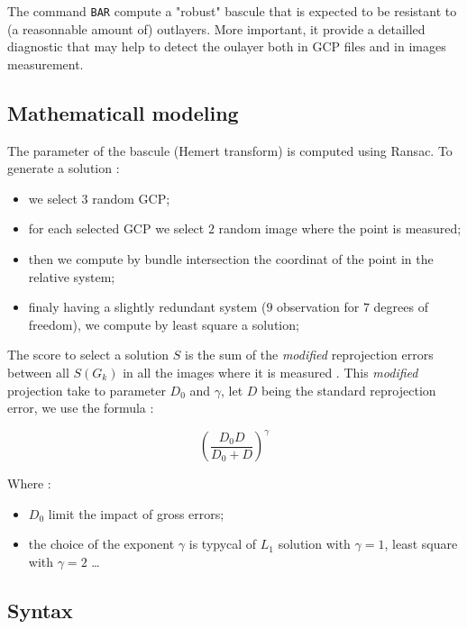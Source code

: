 The command {\tt BAR} compute a "robust" bascule  that is expected to be resistant
to (a reasonnable amount of) outlayers. More important, it provide a detailled
diagnostic that may help to detect the oulayer both in GCP files and in images
measurement.


\subsection{Mathematicall modeling}

The  parameter of the bascule (Hemert transform) is computed using Ransac. To generate
a solution :

\begin{itemize}
   \item we select $3$ random GCP;
   \item for each selected GCP we select $2$ random image where the point is measured;
   \item then we compute by bundle intersection the coordinat of the point in the relative system;
   \item finaly having a slightly  redundant system ($9$ observation for $7$ degrees of freedom), we
         compute by least square a solution;
\end{itemize}

The score to select a solution $S$ is the sum of the \emph{modified} reprojection
errors between all $S(G_k)$ in all the images where it is measured  . 
This  \emph{modified} projection take to parameter $D_0$ and $\gamma$, let $D$ being the
standard reprojection error, we use the formula :

\begin{equation}
    (\frac{D_0 D}{D_0 + D}) ^ \gamma \label{Eq:Reproj:Bar}
\end{equation}

Where :

\begin{itemize}
   \item $D_0$ limit the impact of gross errors;
   \item the choice of the exponent $ \gamma$ is typycal of $L_1$ solution with  $ \gamma=1$,
         least square with  $ \gamma=2$ \dots
\end{itemize}


\subsection{Syntax}

